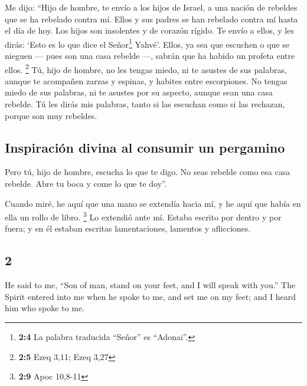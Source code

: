 \begin{paracol}{2}
 Me dijo: ``Hijo de hombre, te envío a los hijos de
Israel, a una nación de rebeldes que se ha rebelado contra mí. Ellos y
sus padres se han rebelado contra mí hasta el día de hoy. 
Los hijos son insolentes y de corazón rígido. Te envío a ellos, y les
dirás: `Esto es lo que dice el Señor\footnote{\textbf{2:4} La palabra
  traducida ``Señor'' es ``Adonai''.} Yahvé'.  Ellos, ya
sea que escuchen o que se nieguen --- pues son una casa rebelde ---,
sabrán que ha habido un profeta entre ellos. \footnote{\textbf{2:5} Ezeq
  3,11; Ezeq 3,27}  Tú, hijo de hombre, no les tengas
miedo, ni te asustes de sus palabras, aunque te acompañen zarzas y
espinas, y habites entre escorpiones. No tengas miedo de sus palabras,
ni te asustes por su aspecto, aunque sean una casa rebelde.
 Tú les dirás mis palabras, tanto si las escuchan como si
las rechazan, porque son muy rebeldes.

\hypertarget{inspiraciuxf3n-divina-al-consumir-un-pergamino}{%
\subsection{Inspiración divina al consumir un
pergamino}\label{inspiraciuxf3n-divina-al-consumir-un-pergamino}}

 Pero tú, hijo de hombre, escucha lo que te digo. No seas
rebelde como esa casa rebelde. Abre tu boca y come lo que te doy''.

 Cuando miré, he aquí que una mano se extendía hacia mí, y
he aquí que había en ella un rollo de libro. \footnote{\textbf{2:9} Apoc
  10,8-11}  Lo extendió ante mí. Estaba escrito por
dentro y por fuera; y en él estaban escritas lamentaciones, lamentos y
aflicciones.

\switchcolumn
\begin{otherlanguage}{english}

\hypertarget{section-3}{%
\section{2}\label{section-3}}

 He said to me, ``Son of man, stand on your feet, and I
will speak with you.''  The Spirit entered into me when he
spoke to me, and set me on my feet; and I heard him who spoke to me.


\end{otherlanguage}
\end{paracol}

